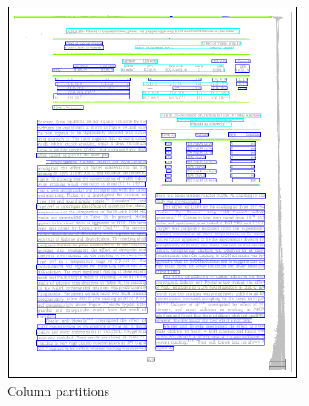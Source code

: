 \begin{figure}[t]
\begin{subfigure}{0.31\textwidth}
\includegraphics[width=\linewidth]{img/tableDetection/tableDetectionPartitions.pdf}
\caption{Column partitions}
\label{fig:tessTableDet2}
\end{subfigure}
\hspace*{\fill} 
\begin{subfigure}{0.31\textwidth}

\end{subfigure}
\end{figure}
